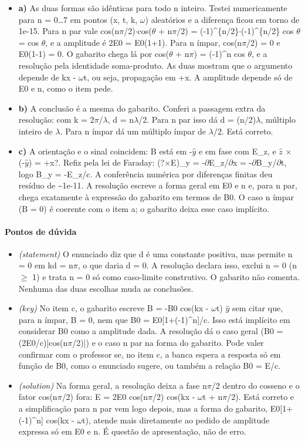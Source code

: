 \documentclass{article}%
\begin{document}
\begin{itemize}%
\item%
\textbf{a)} As duas formas são idênticas para todo n inteiro. Testei numericamente para n = 0\ldots{}7 em pontos (x, t, k, $\omega$) aleatórios e a diferença ficou em torno de 1e-15. Para n par vale cos(n$\pi$/2)$\cdot$cos($\theta$ + n$\pi$/2) = (-1)\^{}\{n/2\}$\cdot$(-1)\^{}\{n/2\} cos $\theta$ = cos $\theta$, e a amplitude é 2E0 = E0(1+1). Para n ímpar, cos(n$\pi$/2) = 0 e E0(1-1) = 0. O gabarito chega lá por cos($\theta$ + n$\pi$) = (-1)\^{}n cos $\theta$, e a resolução pela identidade soma{-}produto. As duas mostram que o argumento depende de kx - $\omega$t, ou seja, propagação em +x. A amplitude depende só de E0 e n, como o item pede.%
\item%
\textbf{b)} A conclusão é a mesma do gabarito. Conferi a passagem extra da resolução: com k = 2$\pi$/$\lambda$, d = n$\lambda$/2. Para n par isso dá d = (n/2)$\lambda$, múltiplo inteiro de $\lambda$. Para n ímpar dá um múltiplo ímpar de $\lambda$/2. Está correto.%
\item%
\textbf{c)} A orientação e o sinal coincidem: B está em -$\hat y$ e em fase com E\_z, e $\hat z$ $\times$ (-$\hat y$) = +x?. Refiz pela lei de Faraday: (?$\times$E)\_y = -$\partial$E\_z/$\partial$x = -$\partial$B\_y/$\partial$t, logo B\_y = -E\_z/c. A conferência numérica por diferenças finitas deu resíduo de \textasciitilde{}1e-11. A resolução escreve a forma geral em E0 e n e, para n par, chega exatamente à expressão do gabarito em termos de B0. O caso n ímpar (B = 0) é coerente com o item a; o gabarito deixa esse caso implícito.%
\end{itemize}%
\paragraph{Pontos de dúvida}%
\begin{itemize}%
\item%
\textit{(statement)} O enunciado diz que d é uma constante positiva, mas permite n = 0 em kd = n$\pi$, o que daria d = 0. A resolução declara isso, exclui n = 0 (n $\geq$ 1) e trata n = 0 só como caso{-}limite construtivo. O gabarito não comenta. Nenhuma das duas escolhas muda as conclusões.%
\item%
\textit{(key)} No item c, o gabarito escreve B = -B0 cos(kx - $\omega$t) $\hat y$ sem citar que, para n ímpar, B = 0, nem que B0 = E0{[}1+(-1)\^{}n{]}/c. Isso está implícito em considerar B0 como a amplitude dada. A resolução dá o caso geral (B0 = (2E0/c)|cos(n$\pi$/2)|) e o caso n par na forma do gabarito. Pode valer confirmar com o professor se, no item c, a banca espera a resposta só em função de B0, como o enunciado sugere, ou também a relação B0 = E/c.%
\item%
\textit{(solution)} Na forma geral, a resolução deixa a fase n$\pi$/2 dentro do cosseno e o fator cos(n$\pi$/2) fora: E = 2E0 cos(n$\pi$/2) cos(kx - $\omega$t + n$\pi$/2). Está correto e a simplificação para n par vem logo depois, mas a forma do gabarito, E0{[}1+(-1)\^{}n{]} cos(kx - $\omega$t), atende mais diretamente ao pedido de amplitude expressa só em E0 e n. É questão de apresentação, não de erro.%
\end{itemize}%
\end{document}
